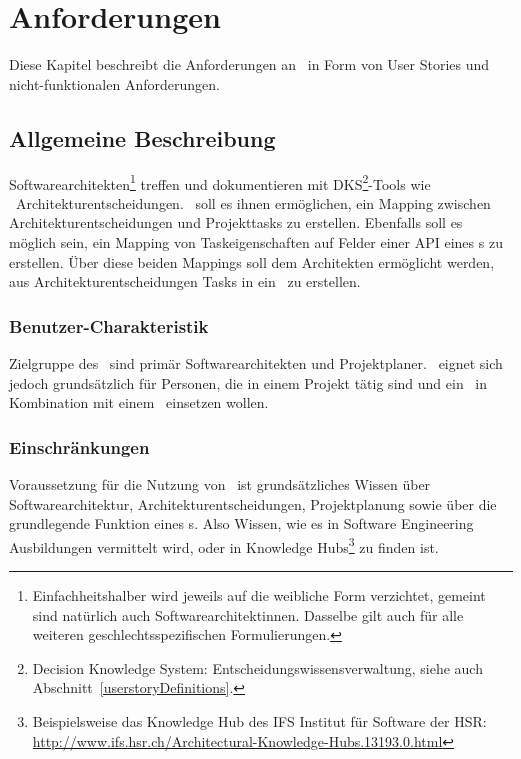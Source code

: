 \chapter{Anforderungen}

Diese Kapitel beschreibt die Anforderungen an \eeppi\ in Form von User Stories und nicht-funktionalen Anforderungen.

\section{Allgemeine Beschreibung}

Softwarearchitekten\footnote{Einfachheitshalber wird jeweils auf die weibliche Form verzichtet, gemeint sind natürlich auch Softwarearchitektinnen. Dasselbe gilt auch für alle weiteren geschlechtsspezifischen Formulierungen.} treffen und dokumentieren mit DKS\footnote{Decision Knowledge System: Entscheidungswissensverwaltung, siehe auch Abschnitt~\ref{userstoryDefinitions}.}-Tools wie \cdar\ Architekturentscheidungen.
\eeppi\ soll es ihnen ermöglichen, ein Mapping zwischen Architekturentscheidungen und Projekttasks zu erstellen.
Ebenfalls soll es möglich sein, ein Mapping von Taskeigenschaften auf Felder einer API eines \ppt s zu erstellen.
Über diese beiden Mappings soll dem Architekten ermöglicht werden, aus Architekturentscheidungen Tasks in ein \ppt\ zu erstellen.

\subsection{Benutzer-Charakteristik}
Zielgruppe des \eeppi\ sind primär Softwarearchitekten und Projektplaner. \eeppi\ eignet sich jedoch grundsätzlich für Personen, die in einem Projekt tätig sind und ein \dks\ in Kombination mit einem \ppt\ einsetzen wollen.

\subsection{Einschränkungen}
Voraussetzung für die Nutzung von \eeppi\ ist grundsätzliches Wissen über Softwarearchitektur, Architekturentscheidungen, Projektplanung sowie über die grundlegende Funktion eines \ppt s.
Also Wissen, wie es in Software Engineering Ausbildungen vermittelt wird,
oder in Knowledge Hubs\footnote{Beispielsweise das Knowledge Hub des IFS Institut für Software der HSR: \url{http://www.ifs.hsr.ch/Architectural-Knowledge-Hubs.13193.0.html}} zu finden ist.